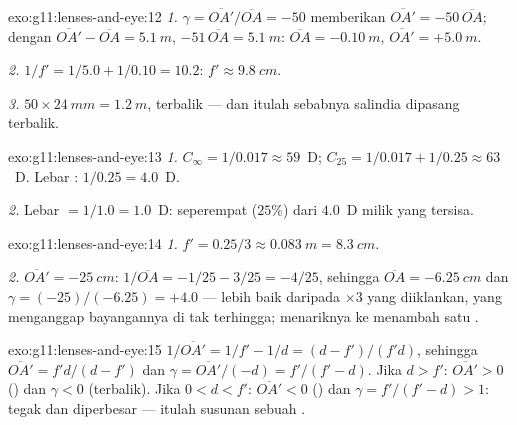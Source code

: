 \begin{solution}{exo:g11:lenses-and-eye:12}
\emph{1.} $\gamma = \overline{OA'}/\overline{OA} = -50$ memberikan
$\overline{OA'} = -50\,\overline{OA}$; dengan
$\overline{OA'} - \overline{OA} = \qty{5.1}{m}$,
$-51\,\overline{OA} = \qty{5.1}{m}$: $\overline{OA} = \qty{-0.10}{m}$,
$\overline{OA'} = +\qty{5.0}{m}$.

\emph{2.} $1/f' = 1/5.0 + 1/0.10 = 10.2$: $f' \approx \qty{9.8}{cm}$.

\emph{3.} $50 \times \qty{24}{mm} = \qty{1.2}{m}$, terbalik --- dan
itulah sebabnya salindia dipasang terbalik.
\end{solution}

\begin{solution}{exo:g11:lenses-and-eye:13}
\emph{1.} $C_\infty = 1/0.017 \approx 59$~D;
$C_{25} = 1/0.017 + 1/0.25 \approx 63$~D. Lebar :
$1/0.25 = 4.0$~D.

\emph{2.} Lebar  $= 1/1.0 = 1.0$~D: seperempat ($25\%$)
dari $4.0$~D milik  yang tersisa.
\end{solution}

\begin{solution}{exo:g11:lenses-and-eye:14}
\emph{1.} $f' = 0.25/3 \approx \qty{0.083}{m} = \qty{8.3}{cm}$.

\emph{2.} $\overline{OA'} = \qty{-25}{cm}$:
$1/\overline{OA} = -1/25 - 3/25 = -4/25$, sehingga
$\overline{OA} = \qty{-6.25}{cm}$ dan
$\gamma = (-25)/(-6.25) = +4.0$ --- lebih baik daripada $\times 3$ yang
diiklankan, yang menganggap bayangannya di tak terhingga; menariknya ke
 menambah satu .
\end{solution}

\begin{solution}{exo:g11:lenses-and-eye:15}
$1/\overline{OA'} = 1/f' - 1/d = (d - f')/(f'd)$, sehingga
$\overline{OA'} = f'd/(d - f')$ dan
$\gamma = \overline{OA'}/(-d) = f'/(f' - d)$. Jika $d > f'$:
$\overline{OA'} > 0$ () dan $\gamma < 0$ (terbalik). Jika
$0 < d < f'$: $\overline{OA'} < 0$ () dan
$\gamma = f'/(f' - d) > 1$: tegak dan diperbesar --- itulah susunan
sebuah .
\end{solution}

